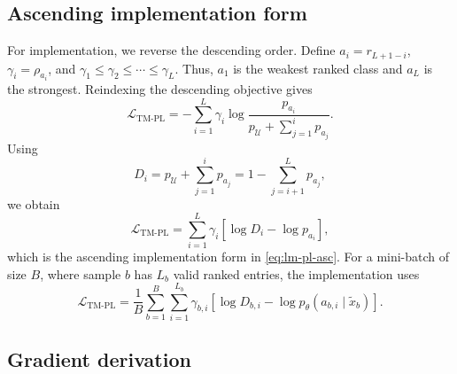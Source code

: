 \subsection{Ascending implementation form}

For implementation, we reverse the descending order. Define \(a_i=r_{L+1-i}\), \(\gamma_i=\rho_{a_i}\), and \(\gamma_1\le\gamma_2\le\cdots\le\gamma_L\).
Thus, $a_1$ is the weakest ranked class and $a_L$ is the strongest. Reindexing the descending objective gives
\[
\mathcal{L}_{\mathrm{TM\text{-}PL}}
=
-\sum_{i=1}^{L}
\gamma_i
\log
\frac{
p_{a_i}
}{
p_{\mathcal U}
+
\sum_{j=1}^{i}p_{a_j}
}.
\]
Using
\[
D_i
=
p_{\mathcal U}
+
\sum_{j=1}^{i}p_{a_j}
=
1-\sum_{j=i+1}^{L}p_{a_j},
\]
we obtain
\[
\mathcal{L}_{\mathrm{TM\text{-}PL}}
=
\sum_{i=1}^{L}
\gamma_i
\left[
\log D_i-\log p_{a_i}
\right],
\]
which is the ascending implementation form in \eqref{eq:lm-pl-asc}. For a mini-batch of size $B$, where sample $b$ has $L_b$ valid ranked entries, the implementation uses
\[
\mathcal{L}_{\mathrm{TM\text{-}PL}}
=
\frac{1}{B}
\sum_{b=1}^{B}
\sum_{i=1}^{L_b}
\gamma_{b,i}
\left[
\log D_{b,i}
-
\log p_\theta(a_{b,i}\mid \tilde{x}_b)
\right].
\]

\subsection{Gradient derivation}

